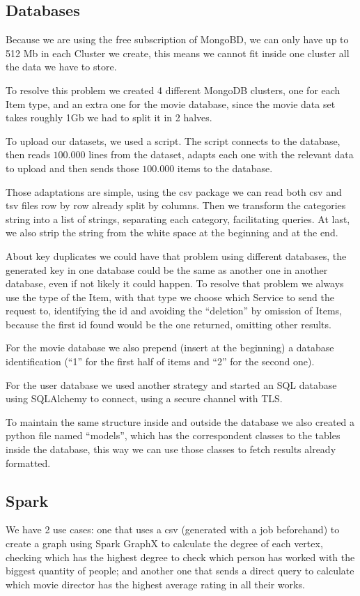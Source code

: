 \documentclass[oneside]{article}
\newcommand*\fpar{\hspace{1ex}}
\begin{document}
    \subsection{Databases}
    \fpar Because we are using the free subscription of MongoBD, we can only have up to 512 Mb in each Cluster we create, this means we cannot fit inside one cluster all the data we have to store.
    \par To resolve this problem we created 4 different MongoDB clusters, one for each Item type, and an extra one for the movie database, since the movie data set takes roughly 1Gb we had to split it in 2 halves.
    \par To upload our datasets, we used a script. The script connects to the database, then reads $100.000$ lines from the dataset, adapts each one with the relevant data to upload and then sends those $100.000$ items to the database. 
    \par Those adaptations are simple, using the csv package we can read both csv and tsv files row by row already split by columns. Then we transform the categories string into a list of strings, separating each category, facilitating queries. At last, we also strip the string from the white space at the beginning and at the end.
    \par About key duplicates we could have that problem using different databases, the generated key in one database could be the same as another one in another database, even if not likely it could happen. To resolve that problem we always use the type of the Item, with that type we choose which Service to send the request to, identifying the id and avoiding the “deletion” by omission of Items, because the first id found would be the one returned, omitting other results.
    \par For the movie database we also prepend (insert at the beginning) a database identification (“1” for the first half of items and “2” for the second one).
    \par For the user database we used another strategy and started an SQL database using SQLAlchemy to connect, using a secure channel with TLS.
    \par To maintain the same structure inside and outside the database we also created a python file named “models”, which has the correspondent classes to the tables inside the database, this way we can use those classes to fetch results already formatted. 

  \subsection{Spark}
  \fpar We have 2 use cases: one that uses a csv (generated with a job beforehand) to create a graph using Spark GraphX to calculate the degree of each vertex, checking which has the highest degree to  check which person has worked with the biggest quantity of people; and another one that sends a direct query to calculate which movie director has the highest average rating in all their works.
\end{document}
